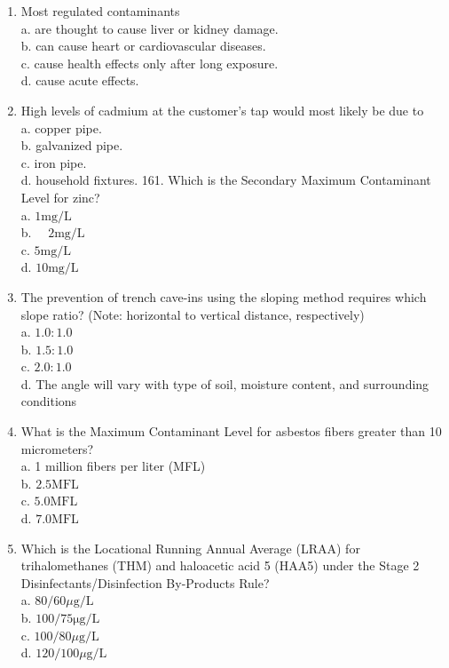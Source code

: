 \documentclass[10pt]{article}
\begin{document}
\begin{enumerate}
  \item Most regulated contaminants\\
a. are thought to cause liver or kidney damage.\\
b. can cause heart or cardiovascular diseases.\\
c. cause health effects only after long exposure.\\
d. cause acute effects.

  \item High levels of cadmium at the customer's tap would most likely be due to\\
a. copper pipe.\\
b. galvanized pipe.\\
c. iron pipe.\\
d. household fixtures. 161. Which is the Secondary Maximum Contaminant Level for zinc?\\
a. $1 \mathrm{mg} / \mathrm{L}$\\
b. $\quad 2 \mathrm{mg} / \mathrm{L}$\\
c. $5 \mathrm{mg} / \mathrm{L}$\\
d. $10 \mathrm{mg} / \mathrm{L}$

  \item The prevention of trench cave-ins using the sloping method requires which slope ratio? (Note: horizontal to vertical distance, respectively)\\
a. $1.0: 1.0$\\
b. $1.5: 1.0$\\
c. $2.0: 1.0$\\
d. The angle will vary with type of soil, moisture content, and surrounding conditions

  \item What is the Maximum Contaminant Level for asbestos fibers greater than 10 micrometers?\\
a. 1 million fibers per liter (MFL)\\
b. $2.5 \mathrm{MFL}$\\
c. $5.0 \mathrm{MFL}$\\
d. $7.0 \mathrm{MFL}$

  \item Which is the Locational Running Annual Average (LRAA) for trihalomethanes (THM) and haloacetic acid 5 (HAA5) under the Stage 2 Disinfectants/Disinfection By-Products Rule?\\
a. $80 / 60 \mu \mathrm{g} / \mathrm{L}$\\
b. $100 / 75 \mathrm{\mu g} / \mathrm{L}$\\
c. $100 / 80 \mu \mathrm{g} / \mathrm{L}$\\
d. $120 / 100 \mu \mathrm{g} / \mathrm{L}$


\end{enumerate}
\end{document}
